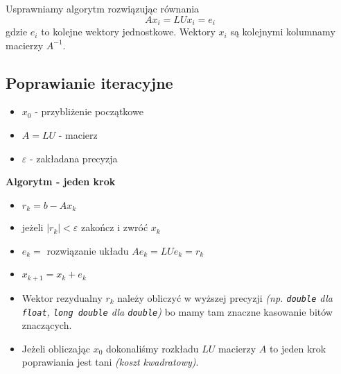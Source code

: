 \documentclass[../mn-notatki.tex]{subfiles}
\begin{document}
Usprawniamy algorytm rozwiązując równania
\[
Ax_i = LUx_i = e_i
\]
gdzie $e_i$ to kolejne wektory jednostkowe. Wektory $x_i$ są kolejnymi
kolumnamy macierzy $A^{-1}$.

\subsection{Poprawianie iteracyjne}

\begin{itemize}
    \item $x_0$ - przybliżenie początkowe
    \item $A = LU$ - macierz
    \item $\varepsilon$ - zakładana precyzja
\end{itemize}
\begin{tcolorbox}
\textbf{Algorytm - jeden krok}
\begin{itemize}
    \item $r_k = b - Ax_k$
    \item jeżeli $|r_k| < \varepsilon$ zakończ i zwróć $x_k$
    \item $e_k = $ rozwiązanie układu $Ae_k = LUe_k = r_k$
    \item $x_{k+1} = x_k + e_k$
\end{itemize}
\end{tcolorbox}

\begin{itemize}
    \item Wektor rezydualny $r_k$ należy obliczyć w wyższej precyzji
    \textit{(np. \texttt{double} dla \texttt{float}, \texttt{long double} dla
    \texttt{double})} bo mamy tam znaczne kasowanie bitów znaczących.
    \item Jeżeli obliczając $x_0$ dokonaliśmy rozkładu $LU$ macierzy $A$ to
    jeden krok poprawiania jest tani \textit{(koszt kwadratowy)}.
\end{itemize}


\pagebreak
\end{document}
